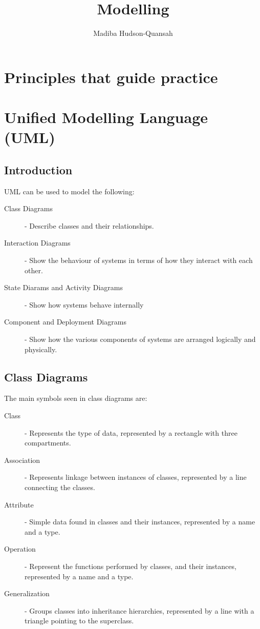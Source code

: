 \documentclass[12pt letter]{report}
\title{\Huge{Modelling}}
\author{\huge{Madiba Hudson-Quansah}}
\date{}
\begin{document}
\maketitle
\newpage
{}
\tableofcontents
\pagebreak

\chapter{Principles that guide practice}

\chapter{Unified Modelling Language (UML)}

\section{Introduction}


UML can be used to model the following:
\begin{description}
  \item[Class Diagrams] - Describe classes and their relationships.
  \item[Interaction Diagrams] - Show the behaviour of systems in terms of how they interact with each other.
  \item[State Diarams and Activity Diagrams] - Show how systems behave internally
  \item[Component and Deployment Diagrams] - Show how the various components of systems are arranged logically and physically.
\end{description}

\section{Class Diagrams}
The main symbols seen in class diagrams are:
\begin{description}
  \item[Class]  - Represents the type of data, represented by a rectangle with three compartments.
  \item[Association] - Represents linkage between instances of classes, represented by a line connecting the classes.
  \item[Attribute] - Simple data found in classes and their instances, represented by a name and a type.
  \item[Operation] - Represent the functions performed by classes, and their instances, represented by a name and a type.
  \item[Generalization] - Groups classes into inheritance hierarchies, represented by a line with a triangle pointing to the superclass.
\end{description}
\end{document}
